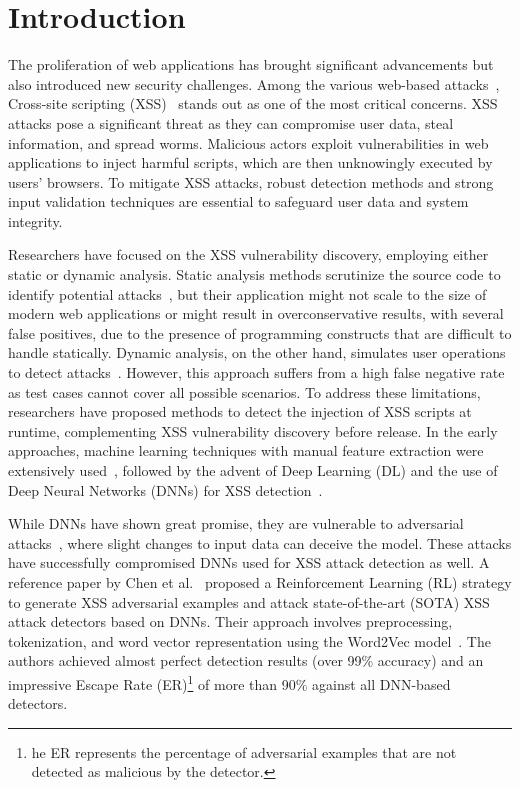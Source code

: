 \section{Introduction}
\label{sec:introduction}
The proliferation of web applications has brought significant advancements but also introduced new security challenges. Among the various web-based attacks~\cite{10008276, aaa9491117}, Cross-site scripting (XSS)~\cite{RODRIGUEZ2020106960} stands out as one of the most critical concerns. XSS attacks pose a significant threat as they can compromise user data, steal information, and spread worms. Malicious actors exploit vulnerabilities in web applications to inject harmful scripts, which are then unknowingly executed by users' browsers. To mitigate XSS attacks, robust detection methods and strong input validation techniques are essential to safeguard user data and system integrity. 

Researchers have focused on the XSS vulnerability discovery, employing either static or dynamic analysis. 
Static analysis methods scrutinize the source code to identify potential attacks~\cite{doupe2013dedacota,steinhauser2016static,mohammadi2017detecting,kronjee2018discovering}, but their application might not scale to the size of modern web applications or might result in overconservative results, with several false positives, due to the presence of programming constructs that are difficult to handle statically.  
Dynamic analysis, on the other hand, simulates user operations to detect attacks~\cite{lekies2013detection,stock2014precise,fazzini2015automatically}. However, this approach suffers from a high false negative rate as test cases cannot cover all possible scenarios. To address these limitations, researchers have proposed methods to detect the injection of XSS scripts at runtime, complementing XSS vulnerability discovery before release. In the early approaches, machine learning techniques with manual feature extraction were extensively used~\cite{likarish2009obfuscated,nunan2012automatic,wang2014machine,rathore2017xssclassifier,mereani2018howe}, followed by the advent of Deep Learning (DL) and the use of Deep Neural Networks (DNNs) for XSS detection~\cite{fang2018deepxss,mokbal2019mlpxss,tekerek2021novel}.


While DNNs have shown great promise, they are vulnerable to adversarial attacks~\cite{goodfellow2014generative}, where slight changes to input data can deceive the model. These attacks have successfully compromised DNNs used for XSS attack detection as well. A reference paper by Chen et al.~\cite{CHEN2022102831} proposed a Reinforcement Learning (RL) strategy to generate XSS adversarial examples and attack state-of-the-art (SOTA) XSS attack detectors based on DNNs. Their approach involves preprocessing, tokenization, and word vector representation using the Word2Vec model~\cite{mikolov2013efficient}. The authors achieved almost perfect detection results (over 99\% accuracy) and an impressive Escape Rate (ER)\footnote{he ER represents the percentage of adversarial examples that are not detected as malicious by the detector.} of more than 90\% against all DNN-based detectors.


